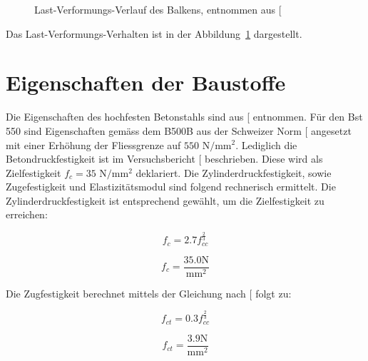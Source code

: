\documentclass[
  12pt,
  letterpaper,
  egregdoesnotlikesansseriftitles]{scrreprt}
\begin{document}
\begin{figure}[H]


\caption{\label{fig-last_verformung_sv14}Last-Verformungs-Verlauf des
Balkens, entnommen aus {[}\citeproc{ref-Tue2019}{2}{]}}

\end{figure}%

Das Last-Verformungs-Verhalten ist in der
Abbildung~\ref{fig-last_verformung_sv14} dargestellt.

\section{Eigenschaften der
Baustoffe}\label{eigenschaften-der-baustoffe-1}

Die Eigenschaften des hochfesten Betonstahls sind aus
{[}\citeproc{ref-annahutte_broschure}{10}{]} entnommen. Für den Bst 550
sind Eigenschaften gemäss dem B500B aus der Schweizer Norm
{[}\citeproc{ref-SIA2013a}{6}{]} angesetzt mit einer Erhöhung der
Fliessgrenze auf \(550 \text{ N}/\text{mm}^2\). Lediglich die
Betondruckfestigkeit ist im Versuchsbericht
{[}\citeproc{ref-Tue2019}{2}{]} beschrieben. Diese wird als
Zielfestigkeit \(f_c = 35 \text{ N}/\text{mm}^2\) deklariert. Die
Zylinderdruckfestigkeit, sowie Zugefestigkeit und Elastizitätsmodul sind
folgend rechnerisch ermittelt. Die Zylinderdruckfestigkeit ist
entsprechend gewählt, um die Zielfestigkeit zu erreichen:

\begin{equation}f_{c} = 2.7 f_{cc}^{\frac{2}{3}}\end{equation}

\begin{equation}f_{c} = \frac{35.0 \text{N}}{\text{mm}^{2}}\end{equation}

Die Zugfestigkeit berechnet mittels der Gleichung nach
{[}\citeproc{ref-Jaeger2013}{9}{]} folgt zu:

\begin{equation}f_{ct} = 0.3 f_{cc}^{\frac{2}{3}}\end{equation}

\begin{equation}f_{ct} = \frac{3.9 \text{N}}{\text{mm}^{2}}\end{equation}
\end{document}
